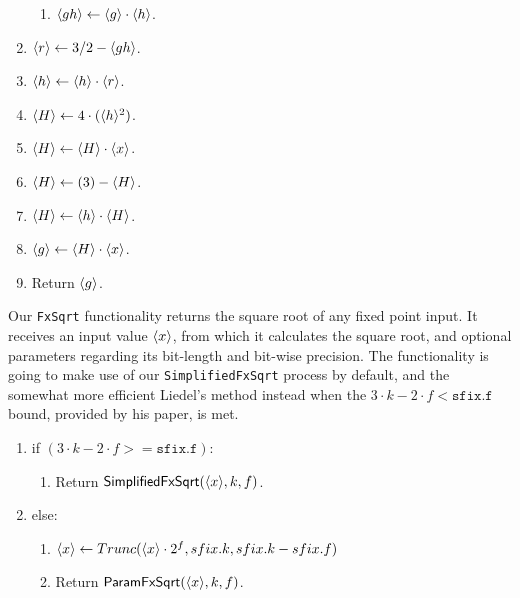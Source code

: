 \begin{enumerate}
\begin{enumerate}
  \item $\langle gh \rangle \leftarrow \langle g \rangle \cdot \langle h \rangle$.
\end{enumerate}
\item $\langle r \rangle \leftarrow 3/2-\langle gh \rangle$.
\item $\langle h \rangle \leftarrow \langle h \rangle \cdot \langle r \rangle$.
\item $\langle H \rangle \leftarrow 4 \cdot (\langle h \rangle^2)$.
\item $\langle H \rangle \leftarrow \langle H \rangle\cdot \langle x \rangle$.
\item $\langle H \rangle \leftarrow (3) - \langle H \rangle$.
\item $\langle H \rangle \leftarrow \langle h \rangle \cdot \langle H \rangle$.
\item $\langle g \rangle \leftarrow \langle H \rangle \cdot \langle x \rangle$.
\item Return $\langle g \rangle$.
\end{enumerate}

Our \verb|FxSqrt| functionality returns the square root of any fixed point input. It receives an input value $\langle x \rangle$, from which it calculates the square root, and optional parameters regarding its bit-length and bit-wise precision. The functionality is going to make use of our \verb|SimplifiedFxSqrt| process by default, and the somewhat more efficient Liedel's method instead when the $3 \cdot k - 2 \cdot f < \mathtt{sfix.f}$ bound, provided by his paper, is met. 

\begin{enumerate}
\item if $(3 \cdot k - 2 \cdot f >= \mathtt{sfix.f})$:
\begin{enumerate}
	\item Return $\mathsf{SimplifiedFxSqrt}(\langle x \rangle, k, f)$.
\end{enumerate}
\item else:
\begin{enumerate}
    \item $\langle x \rangle \leftarrow Trunc(\langle x \rangle \cdot 2^{f}, sfix.k, sfix.k-sfix.f)$
	\item Return $\mathsf{ParamFxSqrt}(\langle x \rangle, k, f)$.
\end{enumerate}
\end{enumerate}


